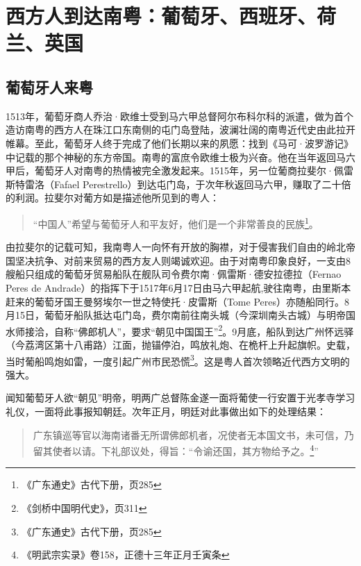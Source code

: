 \chapter{西方人到达南粤：葡萄牙、西班牙、荷兰、英国}

\section{葡萄牙人来粤}

\indent 1513年，葡萄牙商人乔治·欧维士受到马六甲总督阿尔布科尔科的派遣，做为首个造访南粤的西方人在珠江口东南侧的屯门岛登陆，波澜壮阔的南粤近代史由此拉开帷幕。至此，葡萄牙人终于完成了他们长期以来的夙愿：找到《马可·波罗游记》中记载的那个神秘的东方帝国。南粤的富庶令欧维士极为兴奋。他在当年返回马六甲后，葡萄牙人对南粤的热情被完全激发起来。1515年，另一位葡商拉斐尔·佩雷斯特雷洛（Fafael Perestrello）到达屯门岛，于次年秋返回马六甲，赚取了二十倍的利润。拉斐尔对葡方如是描述他所见到的粤人：

\begin{quote}

“中国人”希望与葡萄牙人和平友好，他们是一个非常善良的民族\footnote{《广东通史》古代下册，页285}。

\end{quote}

由拉斐尔的记载可知，我南粤人一向怀有开放的胸襟，对于侵害我们自由的岭北帝国坚决抗争、对前来贸易的西方友人则竭诚欢迎。由于对南粤印象良好，一支由8艘船只组成的葡萄牙贸易船队在舰队司令费尔南·佩雷斯·德安拉德拉（Fernao Peres de Andrade）的指挥下于1517年6月17日由马六甲起航,驶往南粤，由里斯本赶来的葡萄牙国王曼努埃尔一世之特使托·皮雷斯（Tome Peres）亦随船同行。8月15日，葡萄牙船队抵达屯门岛，费尔南前往南头城（今深圳南头古城）与明帝国水师接洽，自称“佛郎机人”，要求“朝见中国国王”\footnote{《剑桥中国明代史》，页311}。9月底，船队到达广州怀远驿（今荔湾区第十八甫路）江面，抛锚停泊，鸣放礼炮、在桅杆上升起旗帜。史载，当时葡船鸣炮如雷，一度引起广州市民恐慌\footnote{《广东通史》古代下册，页285}。这是粤人首次领略近代西方文明的强大。

闻知葡萄牙人欲“朝见”明帝，明两广总督陈金遂一面将葡使一行安置于光孝寺学习礼仪，一面将此事报知朝廷。次年正月，明廷对此事做出如下的处理结果：

\begin{quote}

广东镇巡等官以海南诸番无所谓佛郎机者，况使者无本国文书，未可信，乃留其使者以请。下礼部议处，得旨：“令谕还国，其方物给予之。\footnote{《明武宗实录》卷158，正德十三年正月壬寅条}”

\end{quote}

